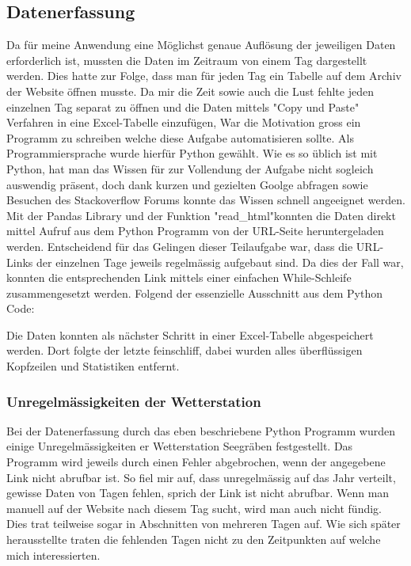 \begin{refsection}
\subsection{Datenerfassung}
Da f\"ur meine Anwendung eine M\"oglichst genaue Aufl\"osung der jeweiligen Daten erforderlich ist, mussten die Daten im Zeitraum von einem Tag dargestellt werden. 
Dies hatte zur Folge, dass man f\"ur jeden Tag ein Tabelle auf dem Archiv der Website \"offnen musste. 
Da mir die Zeit sowie auch die Lust fehlte jeden einzelnen Tag separat zu \"offnen und die Daten mittels "Copy und Paste" Verfahren in eine Excel-Tabelle einzuf\"ugen, War die Motivation gross  ein Programm zu schreiben welche diese Aufgabe automatisieren sollte.
Als Programmiersprache wurde hierf\"ur Python gewählt.
Wie es so üblich ist mit Python, hat man das Wissen für zur Vollendung der Aufgabe nicht sogleich auswendig präsent, doch dank kurzen und gezielten Goolge abfragen sowie Besuchen des Stackoverflow Forums konnte das Wissen schnell angeeignet werden.
Mit der Pandas Library und der Funktion "read\_html"\space konnten die Daten direkt mittel Aufruf aus dem Python Programm von der URL-Seite heruntergeladen werden.
Entscheidend für das Gelingen dieser Teilaufgabe war, dass die URL-Links der einzelnen Tage jeweils regelmässig aufgebaut sind.
Da dies der Fall war, konnten die entsprechenden Link mittels einer einfachen While-Schleife zusammengesetzt werden.
\newpage
Folgend der essenzielle Ausschnitt aus dem Python Code:




Die Daten konnten als nächster Schritt in einer Excel-Tabelle abgespeichert werden.
Dort folgte der letzte feinschliff, dabei wurden alles überflüssigen Kopfzeilen und Statistiken entfernt.

\subsubsection{Unregelmässigkeiten der Wetterstation}
Bei der Datenerfassung durch das eben beschriebene Python Programm wurden einige Unregelmässigkeiten er Wetterstation Seegräben festgestellt.
Das Programm wird jeweils durch einen Fehler abgebrochen, wenn der angegebene Link nicht abrufbar ist. 
So fiel mir auf, dass unregelmässig auf das Jahr verteilt, gewisse Daten von Tagen fehlen, sprich der Link ist nicht abrufbar.
Wenn man manuell auf der Website nach diesem Tag sucht, wird man auch nicht fündig.
Dies trat teilweise sogar in Abschnitten von mehreren Tagen auf.
Wie sich später herausstellte traten die fehlenden Tagen nicht zu den Zeitpunkten auf welche mich interessierten.
\newpage


\end{refsection}

